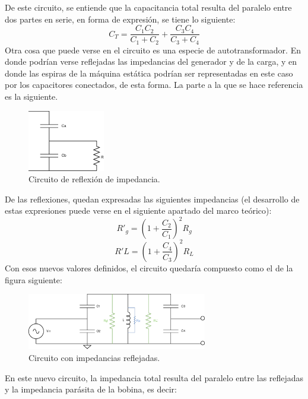 \documentclass{article}
\begin{document}
\noindent De este circuito, se entiende que la capacitancia total resulta del paralelo entre dos partes en serie, en forma de expresión, se tiene lo siguiente:
\begin{equation*}
    C_T = \frac{C_1 C_2}{C_1 + C_2} + \frac{C_3 C_4}{C_3 + C_4}
\end{equation*}
Otra cosa que puede verse en el circuito es una especie de autotransformador. En donde podrían verse reflejadas las impedancias del generador y de la carga, y en donde las espiras de la máquina estática podrían ser representadas en este caso por los capacitores conectados, de esta forma. La parte a la que se hace referencia es la siguiente.
\begin{figure}[H]
\centering
\includegraphics[width=0.3\textwidth]{./img/figura3.eps}
\caption{Circuito de reflexión de impedancia.}
\label{fig:circuito3}
\end{figure}
\noindent De las reflexiones, quedan expresadas las siguientes impedancias (el desarrollo de estas expresiones puede verse en el siguiente apartado del marco teórico):
\begin{equation*}
    R'_g = \left( 1 + \frac{C_2}{C_1} \right)^2 R_g
\end{equation*}
\begin{equation*}
    R'L = \left( 1 + \frac{C_4}{C_3} \right)^2 R_L
\end{equation*}
\noindent Con esos nuevos valores definidos, el circuito quedaría compuesto como el de la figura siguiente:
\begin{figure}[H]
\centering
\includegraphics[width=0.7\textwidth]{./img/figura4.eps}
\caption{Circuito con impedancias reflejadas.}
\label{fig:circuito4}
\end{figure}
\noindent En este nuevo circuito, la impedancia total resulta del paralelo entre las reflejadas y la impedancia parásita de la bobina, es decir:
\end{document}
